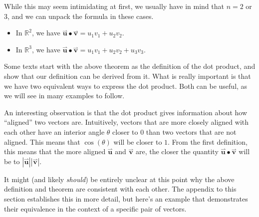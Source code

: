 \documentclass{ximera}
\begin{document}
While this may seem intimidating at first, we usually have in mind that $n=2$ or $3$, and we can unpack the formula in these cases.  

\begin{itemize}
\item In $\mathbb{R}^2$, we have $\overset{\boldsymbol{\rightharpoonup}}{\mathbf{u}} \bullet \overset{\boldsymbol{\rightharpoonup}}{\mathbf{v}} = u_1v_1+u_2v_2$.
\item In $\mathbb{R}^3$, we have $\overset{\boldsymbol{\rightharpoonup}}{\mathbf{u}} \bullet\overset{\boldsymbol{\rightharpoonup}}{\mathbf{v}} = u_1v_1+u_2v_2+u_3v_3$.
\end{itemize}

Some texts start with the above theorem as the definition of the dot product, and show that our definition can be derived from it.  What is really important is that we have two equivalent ways to express the dot product.  Both can be useful, as we will see in many examples to follow.

\begin{remark}
An interesting observation is that the dot product gives information about how ``aligned'' two vectors are.  Intuitively, vectors that are more closely aligned with each other have an interior angle $\theta$ closer to $0$ than two vectors that are not aligned.  This means that $\cos(\theta)$ will be closer to $1$. From the first definition, this means that the more aligned $\overset{\boldsymbol{\rightharpoonup}}{\mathbf{u}}$ and $\overset{\boldsymbol{\rightharpoonup}}{\mathbf{v}}$ are, the closer the quantity $\overset{\boldsymbol{\rightharpoonup}}{\mathbf{u}} \bullet \overset{\boldsymbol{\rightharpoonup}}{\mathbf{v}}$ will be to $|\overset{\boldsymbol{\rightharpoonup}}{\mathbf{u}}||\overset{\boldsymbol{\rightharpoonup}}{\mathbf{v}}|$.
\end{remark}




It might (and likely \emph{should}) be entirely unclear at this point why the above definition and theorem are consistent with each other.  The appendix to this section establishes this in more detail, but here's an example that demonstrates their equivalence in the context of a specific pair of vectors.
\end{document}
